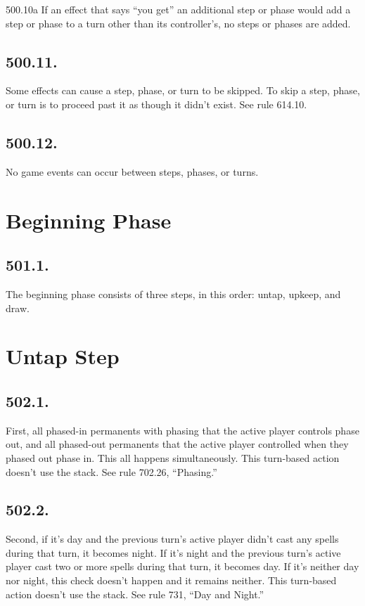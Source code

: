 500.10a If an effect that says “you get” an additional step or phase would add a step or phase to a turn other than its controller’s, no steps or phases are added.

\subsection*{500.11.}
Some effects can cause a step, phase, or turn to be skipped. To skip a step, phase, or turn is to proceed past it as though it didn’t exist. See rule 614.10.

\subsection*{500.12.}
No game events can occur between steps, phases, or turns.

\section{Beginning Phase}
\subsection*{501.1.}
The beginning phase consists of three steps, in this order: untap, upkeep, and draw.

\section{Untap Step}
\subsection*{502.1.}
First, all phased-in permanents with phasing that the active player controls phase out, and all phased-out permanents that the active player controlled when they phased out phase in. This all happens simultaneously. This turn-based action doesn’t use the stack. See rule 702.26, “Phasing.”

\subsection*{502.2.}
Second, if it’s day and the previous turn’s active player didn’t cast any spells during that turn, it becomes night. If it’s night and the previous turn’s active player cast two or more spells during that turn, it becomes day. If it’s neither day nor night, this check doesn’t happen and it remains neither. This turn-based action doesn’t use the stack. See rule 731, “Day and Night.”

